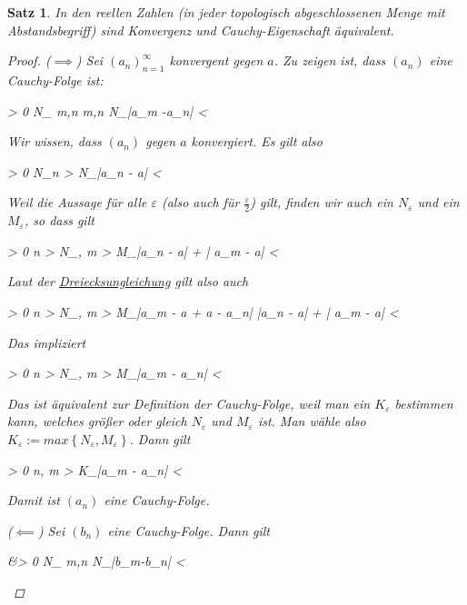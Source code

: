 \documentclass{article}
\newtheorem{thm}{Satz}[section]
\newenvironment{aleq*}{\begin{equation*}\begin{aligned}}{\end{aligned}\end{equation*}}
\begin{document}
	\begin{thm}
		In den reellen Zahlen (in jeder topologisch abgeschlossenen Menge mit Abstandsbegriff) sind Konvergenz und Cauchy-Eigenschaft äquivalent.
		
		\begin{proof}
			(\(\implies\)) Sei \((a_n)_{n=1}^\infty\) konvergent gegen \(a\). Zu zeigen ist, dass \((a_n)\) eine Cauchy-Folge ist:
			\begin{aleq*}
				\forall \varepsilon > 0 \colon \exists N_\varepsilon \in {} \colon \forall m,n \in {} \colon m,n \geq N_\varepsilon \implies |a_m -a_n| < \varepsilon
			\end{aleq*}
			\par
			Wir wissen, dass \((a_n)\) gegen \(a\) konvergiert. Es gilt also
			\begin{aleq*}
				\forall \varepsilon > 0 \colon \exists N_\varepsilon \colon \forall n > N_\varepsilon \colon |a_n - a| < \varepsilon \text{.}
			\end{aleq*}
			\par
			Weil die Aussage für alle \(\varepsilon\) (also auch für \(\frac{\varepsilon}{2}\)) gilt, finden wir auch ein \(N_\varepsilon\) und ein \(M_\varepsilon\), so dass gilt
			\begin{aleq*}
				\forall \varepsilon > 0 \colon \forall n > N_\varepsilon, m > M_\varepsilon \colon |a_n - a| + | a_m - a| < \varepsilon {}
			\end{aleq*}
			
			\par
			Laut der \hyperref[dreiecksungleichung]{Dreiecksungleichung} gilt also auch
			\begin{aleq*}
				\forall \varepsilon > 0 \colon \forall n > N_\varepsilon, m > M_\varepsilon \colon |a_m - a + a - a_n| \leq |a_n - a| + | a_m - a| < \varepsilon \text{.}
			\end{aleq*}
			\par
			Das impliziert
			\begin{aleq*}
				\forall \varepsilon > 0 \colon \forall n > N_\varepsilon, m > M_\varepsilon \colon |a_m - a_n| < \varepsilon {}
			\end{aleq*}
			\par
			Das ist äquivalent zur Definition der Cauchy-Folge, weil man ein \(K_\varepsilon\) bestimmen kann, welches größer oder gleich \(N_\varepsilon\) und \(M_\varepsilon\) ist. Man wähle also \(K_\varepsilon := max \left\lbrace N_\varepsilon, M_\varepsilon\right\rbrace\). Dann gilt
			\begin{aleq*}
				\forall \varepsilon > 0 \colon \forall n, m > K_\varepsilon \colon |a_m - a_n| < \varepsilon \text{.}
			\end{aleq*}
			\par
			Damit ist \((a_n)\) eine Cauchy-Folge.
			\par
			(\(\impliedby\)) Sei \((b_n)\) eine Cauchy-Folge. Dann gilt
			\begin{aleq*}
				&\forall \varepsilon > 0 \colon \exists N_\varepsilon \in {} \colon \forall m,n \geq N_\varepsilon \colon |b_m-b_n| < \varepsilon {}
			\end{aleq*}
			

\end{proof}
\end{thm}
\end{document}
